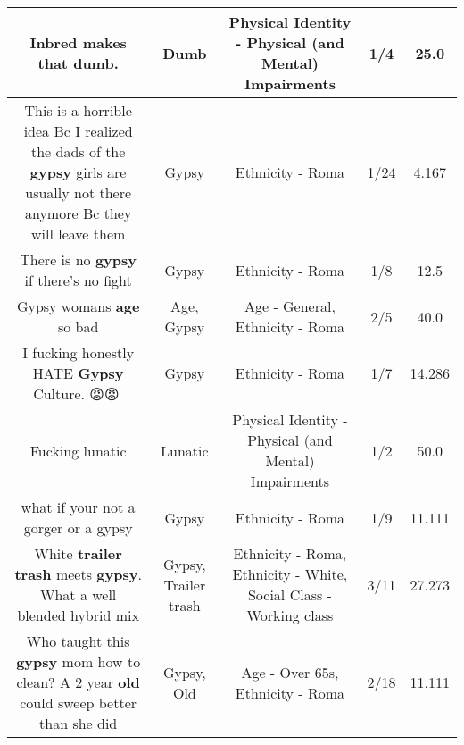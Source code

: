 \documentclass[11pt]{article}
\newlength\mylength
\begin{document}
\begin{center}
\begin{longtable}{|C{.65\mylength}|C{.30\mylength}|C{.12\mylength}|C{.12\mylength}|C{.12\mylength}|}
  \small Inbred makes that \textbf{dumb}.\normalsize   & Dumb & Physical Identity - Physical (and Mental) Impairments & 1/4 & 25.0 \\  \hline
  \small This is a horrible idea Bc I realized the dads of the \textbf{gypsy} girls are usually not there anymore Bc they will leave them\normalsize   & Gypsy & Ethnicity - Roma & 1/24 & 4.167 \\  \hline
  \small There is no \textbf{gypsy} if there's no fight\normalsize   & Gypsy & Ethnicity - Roma & 1/8 & 12.5 \\  \hline
  \small Gypsy womans \textbf{age} so bad\normalsize   & Age, Gypsy & Age - General, Ethnicity - Roma & 2/5 & 40.0 \\  \hline
  \small I fucking honestly HATE \textbf{Gypsy} Culture. 😡😡💩\normalsize   & Gypsy & Ethnicity - Roma & 1/7 & 14.286 \\  \hline
  \small Fucking lunatic\normalsize   & Lunatic & Physical Identity - Physical (and Mental) Impairments & 1/2 & 50.0 \\  \hline
  \small what if your not a gorger or a gypsy\normalsize   & Gypsy & Ethnicity - Roma & 1/9 & 11.111 \\  \hline
  \small White \textbf{t\textbf{railer trash}} meets \textbf{gypsy}. What a well blended hybrid mix\normalsize   & Gypsy, Trailer trash & Ethnicity - Roma, Ethnicity - White, Social Class - Working class & 3/11 & 27.273 \\  \hline
  \small Who taught this \textbf{gypsy} mom how to clean? A 2 year \textbf{old} could sweep better than she did\normalsize   & Gypsy, Old & Age - Over 65s, Ethnicity - Roma & 2/18 & 11.111 \\  \hline

\end{longtable}
\end{center}
\end{document}
